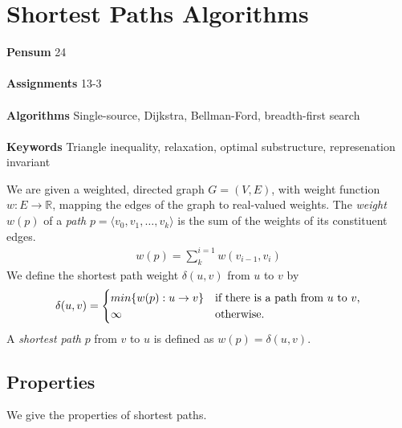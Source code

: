 
\chapter{Shortest Paths Algorithms}
\label{ch:shortestpathsalgorithms}

\textbf{Pensum} 24 \cite{clrs} \\\\
\textbf{Assignments} 13-3 \\\\
\textbf{Algorithms} Single-source, Dijkstra, Bellman-Ford, breadth-first
search \\\\
\textbf{Keywords} Triangle inequality, relaxation, optimal substructure,
represenation invariant
\vspace{1in}

\noindent We are given a weighted, directed graph $G = (V, E)$, with weight
function $w : E \rightarrow \mathbb{R}$, mapping the edges of the graph to
real-valued weights. The \textit{weight} $w(p)$ of a \textit{path} $p =
\langle v_0, v_1, \dots, v_k \rangle$ is the sum of the weights of its
constituent edges.
\begin{align}
	w(p) = \sum_{k}^{i=1} w(v_{i-1}, v_i)
\end{align}
We define the shortest path weight $\delta(u, v)$ from $u$ to $v$ by
\begin{align}
	\delta(u, v) =
	\begin{cases}
		min\{w(p): u \rightarrow v\}
		& \textnormal{if there is a path from $u$ to $v$,} \\
		\infty & \textnormal{otherwise.}
	\end{cases}
\end{align}
A \textit{shortest path} $p$ from $v$ to $u$ is defined as $w(p) =
\delta(u, v)$.

\section{Properties}
We give the properties of shortest paths.

